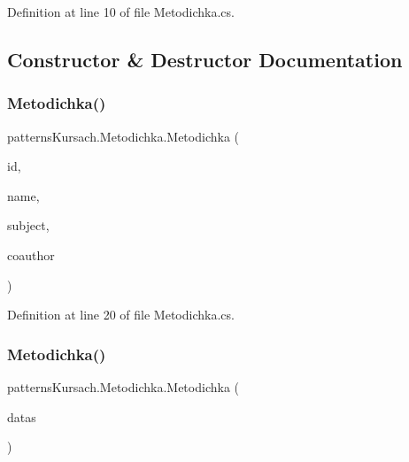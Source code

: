 Definition at line 10 of file Metodichka.\+cs.



\subsection{Constructor \& Destructor Documentation}
\mbox{\label{classpatterns_kursach_1_1_metodichka_ae38e404f5ac9b9bbbc015d4303616dbc}} 
\subsubsection{\texorpdfstring{Metodichka()}{Metodichka()}\hspace{0.1cm}{\footnotesize\ttfamily [1/2]}}
{\footnotesize\ttfamily patterns\+Kursach.\+Metodichka.\+Metodichka (\begin{DoxyParamCaption}\item[{int}]{id,  }\item[{string}]{name,  }\item[{string}]{subject,  }\item[{string}]{coauthor }\end{DoxyParamCaption})}



Definition at line 20 of file Metodichka.\+cs.

\mbox{\label{classpatterns_kursach_1_1_metodichka_a21bfce8717cc47d75b3b6a102cd2e076}} 
\subsubsection{\texorpdfstring{Metodichka()}{Metodichka()}\hspace{0.1cm}{\footnotesize\ttfamily [2/2]}}
{\footnotesize\ttfamily patterns\+Kursach.\+Metodichka.\+Metodichka (\begin{DoxyParamCaption}\item[{Data\+Row}]{datas }\end{DoxyParamCaption})}



